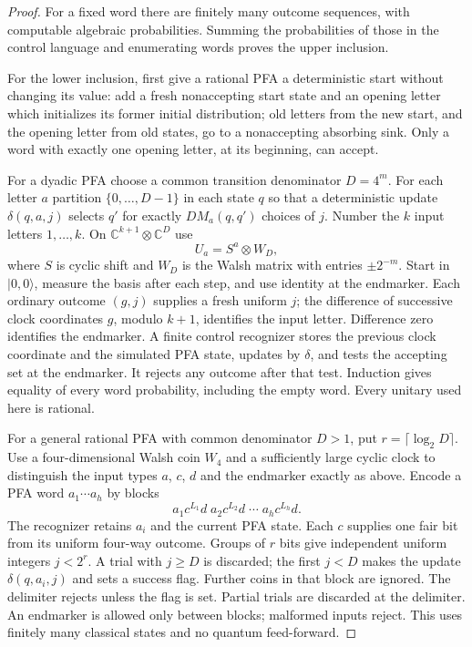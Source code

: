 \documentclass[11pt]{article}
\theoremstyle{plain}
\theoremstyle{definition}
\theoremstyle{remark}
\begin{document}
\begin{proof}
For a fixed word there are finitely many outcome sequences, with computable algebraic probabilities. Summing the probabilities of those in the control language and enumerating words proves the upper inclusion.

For the lower inclusion, first give a rational PFA a deterministic start without changing its value: add a fresh nonaccepting start state and an opening letter which initializes its former initial distribution; old letters from the new start, and the opening letter from old states, go to a nonaccepting absorbing sink. Only a word with exactly one opening letter, at its beginning, can accept.

For a dyadic PFA choose a common transition denominator $D=4^m$. For each letter $a$ partition $\{0,\ldots,D-1\}$ in each state $q$ so that a deterministic update $\delta(q,a,j)$ selects $q'$ for exactly $DM_a(q,q')$ choices of $j$. Number the $k$ input letters $1,\ldots,k$. On $\mathbb C^{k+1}\otimes\mathbb C^D$ use
\[
 U_a=S^a\otimes W_D,
\]
where $S$ is cyclic shift and $W_D$ is the Walsh matrix with entries $\pm2^{-m}$. Start in $|0,0\rangle$, measure the basis after each step, and use identity at the endmarker. Each ordinary outcome $(g,j)$ supplies a fresh uniform $j$; the difference of successive clock coordinates $g$, modulo $k+1$, identifies the input letter. Difference zero identifies the endmarker. A finite control recognizer stores the previous clock coordinate and the simulated PFA state, updates by $\delta$, and tests the accepting set at the endmarker. It rejects any outcome after that test. Induction gives equality of every word probability, including the empty word. Every unitary used here is rational.

For a general rational PFA with common denominator $D>1$, put $r=\lceil\log_2D\rceil$. Use a four-dimensional Walsh coin $W_4$ and a sufficiently large cyclic clock to distinguish the input types $a$, $c$, $d$ and the endmarker exactly as above. Encode a PFA word $a_1\cdots a_h$ by blocks
\[
 a_1c^{L_1}d\;a_2c^{L_2}d\;\cdots\;a_hc^{L_h}d.
\]
The recognizer retains $a_i$ and the current PFA state. Each $c$ supplies one fair bit from its uniform four-way outcome. Groups of $r$ bits give independent uniform integers $j<2^r$. A trial with $j\ge D$ is discarded; the first $j<D$ makes the update $\delta(q,a_i,j)$ and sets a success flag. Further coins in that block are ignored. The delimiter rejects unless the flag is set. Partial trials are discarded at the delimiter. An endmarker is allowed only between blocks; malformed inputs reject. This uses finitely many classical states and no quantum feed-forward.


\end{proof}
\end{document}
